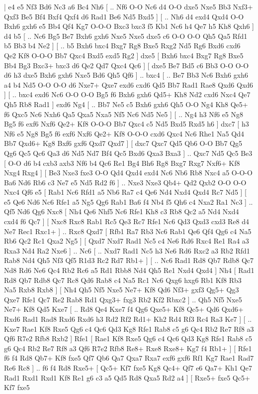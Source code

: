 \makegametitle 
|   e4   e5    Nf3   Bd6    Nc3   a6    Bc4   Nh6 [ .. Nf6  O-O Nc6  d4 O-O  dxe5 Nxe5  Bb3 Nxf3+  Qxf3 Be5  Bf4 Bxf4  Qxf4 d6  Rad1 Be6  Nd5 Bxd5   ]  [ .. Nh6  d4 exd4  Qxd4 O-O  Bxh6 gxh6  e5 Bb4  Qf4 Kg7  O-O-O Bxc3  bxc3 f5  Kb1 Nc6  h4 Qe7  h5 Kh8  Qxh6   ]  d4   b5 [ .. Nc6  Bg5 Be7  Bxh6 gxh6  Nxe5 Nxe5  dxe5 c6  O-O O-O  Qh5 Qa5  Rfd1 b5  Bb3 b4  Ne2   ]  [ .. b5  Bxh6 bxc4  Bxg7 Rg8  Bxe5 Rxg2  Nd5 Rg6  Bxd6 cxd6  Qe2 Kf8  O-O-O Bb7  Qxc4 Bxd5  exd5 Rg2   ]  dxe5 [  Bxh6 bxc4  Bxg7 Rg8  Bxe5 Bb4  Bg3 Bxc3+  bxc3 d6  Qe2 Qd7  Qxc4 Qc6   ]  [  dxe5 Be7  Bd5 c6  Bb3 O-O  O-O d6  h3 dxe5  Bxh6 gxh6  Nxe5 Bd6  Qh5 Qf6   ] .. bxc4 [ .. Be7  Bb3 Nc6  Bxh6 gxh6  a4 b4  Nd5 O-O  O-O d6  Nxe7+ Qxe7  exd6 cxd6  Qd5 Bb7  Rad1 Rae8  Qxd6 Qxd6   ]  [ .. bxc4  exd6 Nc6  O-O O-O  Bg5 f6  Bxh6 gxh6  Qd5+ Kh8  Nd2 cxd6  Nxc4 Qe7  Qh5 Rb8  Rad1   ]  exd6   Ng4 [ .. Bb7  Ne5 c5  Bxh6 gxh6  Qh5 O-O  Ng4 Kh8  Qe5+ f6  Qxc5 Nc6  Nxh6 Qa5  Qxa5 Nxa5  Nf5 Nc6  Nd5 Ne5   ]  [ .. Ng4  h3 Nf6  e5 Ng8  Bg5 f6  exf6 Nxf6  Qe2+ Kf8  O-O-O Bb7  Qxc4 c5  Nd5 Bxd5  Rxd5 h6   ]  dxc7 [  h3 Nf6  e5 Ng8  Bg5 f6  exf6 Nxf6  Qe2+ Kf8  O-O-O cxd6  Qxc4 Nc6  Rhe1 Na5  Qd4 Bb7  Qxd6+ Kg8  Bxf6 gxf6  Qxd7 Qxd7   ]  [  dxc7 Qxc7  Qd5 Qb6  O-O Bb7  Qg5 Qg6  Qc5 Qc6  Qa3 d6  Nd5 Nd7  Bf4 Qc5  Bxd6 Qxa3  Bxa3   ] .. Qxc7    Nd5   Qc5    Be3 [  O-O d6  b4 cxb3  axb3 Nf6  b4 Qc6  Re1 Bg4  Bh6 Rg8  Bxg7 Rxg7  Nxf6+ Kf8  Nxg4 Rxg4   ]  [  Be3 Nxe3  fxe3 O-O  Qd4 Qxd4  exd4 Nc6  Nb6 Rb8  Nxc4 a5  O-O-O Ba6  Nd6 Rb6  c3 Ne7  e5 Nd5  Rd2 f6   ] .. Nxe3    Nxe3   Qb4+    Qd2   Qxb2    O-O   O-O    Nxc4   Qf6    e5 [  Rab1 Nc6  Rfd1 a5  Nb6 Ra7  c4 Qe6  Nd4 Nxd4  Qxd4 Rc7  Nd5   ]  [  e5 Qe6  Nd6 Nc6  Rfe1 a5  Ng5 Qg6  Rab1 Ba6  f4 Nb4  f5 Qh6  c4 Nxa2  Ra1 Nc3   ] .. Qf5    Nd6   Qg6    Nxc8 [  Nh4 Qe6  Nhf5 Nc6  Rfe1 Kh8  c3 Rb8  Qc2 a5  Nd4 Nxd4  cxd4 f6  Qc7   ]  [  Nxc8 Rxc8  Rab1 Rc5  Qe3 Rc7  Rfe1 Nc6  Qd3 Qxd3  cxd3 Re8  d4 Ne7  Rec1 Rxc1+   ] .. Rxc8    Qxd7 [  Rfb1 Ra7  Rb3 Nc6  Rab1 Qe6  Qf4 Qg6  c4 Na5  Rb6 Qc2  Rc1 Qxa2  Ng5   ]  [  Qxd7 Nxd7  Rad1 Nc5  c4 Ne6  Rd6 Rxc4  Re1 Ra4  a3 Rxa3  Nd4 Ra2  Nxe6   ] .. Nc6 [ .. Nxd7  Rad1 Nc5  h3 Ne6  Rd6 Rxc2  a3 Rb2  Rfd1 Rab8  Nd4 Qh5  Nf3 Qf5  R1d3 Rc2  Rd7 Rb1+   ]  [ .. Nc6  Rad1 Rd8  Qb7 Rdb8  Qc7 Nd8  Rd6 Ne6  Qc4 Rb2  Rc6 a5  Rd1 Rbb8  Nd4 Qh5  Re1 Nxd4  Qxd4   ]  Nh4 [  Rad1 Rd8  Qb7 Rdb8  Qc7 Rc8  Qd6 Rab8  c4 Na5  Rc1 Nc6  Qxg6 hxg6  Rb1 Kf8  Rb3 Na5  Rxb8 Rxb8   ]  [  Nh4 Qh5  Nf5 Nxe5  Ne7+ Kf8  Qd6 Nf3+  gxf3 Qg5+  Qg3 Qxe7  Rfe1 Qc7  Re2 Rab8  Rd1 Qxg3+  fxg3 Rb2  Kf2 Rbxc2   ] .. Qh5    Nf5   Nxe5    Ne7+   Kf8    Qd5   Kxe7 [ .. Rd8  Qe4 Kxe7  f4 Qg6  Qxe5+ Kf8  Qc5+ Qd6  Qxd6+ Rxd6  Rad1 Rad8  Rxd6 Rxd6  h3 Rd2  Rf2 Rd1+  Kh2 Rd4  Rf3 Rc4  Ra3 Ke7   ]  [ .. Kxe7  Rae1 Kf8  Rxe5 Qg6  c4 Qc6  Qd3 Kg8  Rfe1 Rab8  c5 g6  Qc4 Rb2  Re7 Rf8  a3 Qf6  R7e2 Rfb8  Rxb2   ]  Rfe1 [  Rae1 Kf8  Rxe5 Qg6  c4 Qc6  Qd3 Kg8  Rfe1 Rab8  c5 g6  Qc4 Rb2  Re7 Rf8  a3 Qf6  R7e2 Rfb8  Re8+ Rxe8  Rxe8+ Kg7  f4 Rb1+   ]  [  Rfe1 f6  f4 Rd8  Qb7+ Kf8  fxe5 Qf7  Qb6 Qa7  Qxa7 Rxa7  exf6 gxf6  Rf1 Kg7  Rae1 Rad7  Re6 Rc8   ] .. f6    f4   Rd8    Rxe5+ [  Qc5+ Kf7  fxe5 Kg8  Qc4+ Qf7  e6 Qa7+  Kh1 Qe7  Rad1 Rxd1  Rxd1 Kf8  Re1 g6  c3 a5  Qd5 Rd8  Qxa5 Rd2  a4   ]  [  Rxe5+ fxe5  Qc5+ Kf7  fxe5 